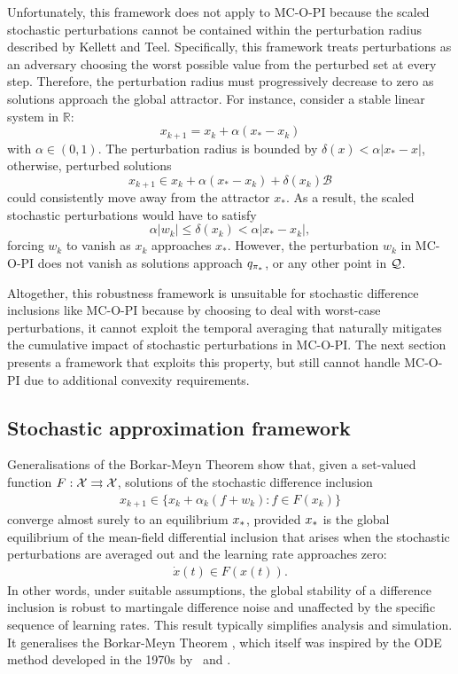 Unfortunately,
this framework does not apply to MC-O-PI because the scaled stochastic perturbations cannot be contained within the perturbation radius described by Kellett and Teel.
Specifically, this framework treats perturbations as an adversary choosing the worst possible value from the perturbed set at every step.
Therefore, the perturbation radius must progressively decrease to zero as solutions approach the global attractor.
For instance, consider a stable linear system in $\mathbb R$:
\[
x_{k+1} = x_k + \alpha (x_* - x_k)
\]
with $\alpha \in (0,1)$.
The perturbation radius is bounded by 
$\delta(x) < \alpha | x_* - x |$,
otherwise, perturbed solutions
\[
x_{k+1} \in x_k + \alpha (x_* - x_k) + \delta(x_k) \mathcal B
\]
could consistently move away from the attractor $x_*$.
As a result, the scaled stochastic perturbations would have to satisfy
\[
\alpha |w_k| \le \delta(x_k) < \alpha | x_* - x_k | ,
\]
forcing $w_k$ to vanish as $x_k$ approaches $x_*$.
However, the perturbation $w_k$ in MC-O-PI does not vanish as solutions approach $q_{{\pi}_*}$, or any other point in $\mathcal{Q}$.


Altogether, this robustness framework is unsuitable for stochastic difference inclusions like MC-O-PI because by choosing to deal with worst-case perturbations, it cannot exploit the temporal averaging that naturally mitigates the cumulative impact of stochastic perturbations in MC-O-PI.
The next section presents a framework that exploits this property, but still cannot handle MC-O-PI due to additional convexity requirements.

\subsection{Stochastic approximation framework}

Generalisations of the Borkar-Meyn Theorem \citep{Benaim2005StochasticInclusions, Ramaswamy2017AInclusions, Perkins2012AsynchronousInclusions}
show that, given a set-valued function $F : \mathcal{X} \rightrightarrows \mathcal{X}$, solutions of the stochastic difference inclusion
\begin{align*}
    x_{k+1} \in \big\{ x_k + \alpha_k ( f + w_k ) : f \in F(x_k) \big\} 
\end{align*}
converge almost surely to an equilibrium ${x}_*$,
provided ${x}_*$ is the global equilibrium of the mean-field differential inclusion that arises when the stochastic perturbations are averaged out and the learning rate approaches zero:
\begin{align*}
    \dot{x}(t) \in F(x(t)) .
\end{align*}
In other words, under suitable assumptions, the global stability of a difference inclusion is robust to martingale difference noise and unaffected by the specific sequence of learning rates.
This result typically simplifies analysis and simulation. 
It generalises the Borkar-Meyn Theorem \citep[Theorem~2.2]{Borkar2000TheLearning}, which itself was inspired by the ODE method developed in the 1970s by~\cite{Derevitskii1974TwoAlgorithms} and \cite{Ljung1977AnalysisAlgorithms}.


